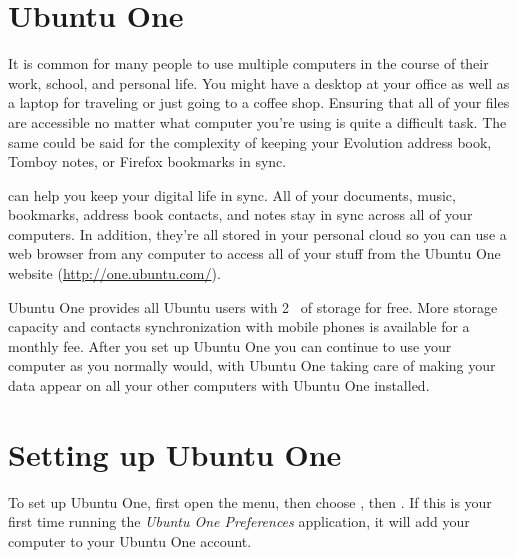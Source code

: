 
\begin{comment}

OUTLINE

[DONE] - Intro - What does Ubuntu One do
[DONE] - What are the Ubuntu 10.04 LTS features (files, notes, contacts, bookmarks, music sync)
[DONE] - How to setup? Launch the Preferences application for new and existing users, create an Ubuntu SSO account and subscribe to a plan. Add computer - add screenshot of Ubuntu One launcher under System > Preferences
[DONE] - Tour of Preferences application
[DONE] - Website features - http://one.ubuntu.com/
[DONE] - Where to get support - /support/, check blog, and read twitter/identi.ca

\end{comment}

\section{Ubuntu One}

It is common for many people to use multiple computers in the course of their work, school, and personal life. You might have a desktop at your office as well as a laptop for traveling or just going to a coffee shop. Ensuring that all of your files are accessible no matter what computer you're using is quite a difficult task. The same could be said for the complexity of keeping your Evolution address book, Tomboy notes, or Firefox bookmarks in sync.

 can help you keep your digital life in sync. All of your documents, music, bookmarks, address book contacts, and notes stay in sync across all of your computers. In addition, they're all stored in your personal cloud so you can use a web browser from any computer to access all of your stuff from the Ubuntu One website (\url{http://one.ubuntu.com/}).

Ubuntu One provides all Ubuntu users with 2~ of storage for free. More storage capacity and contacts synchronization with mobile phones is available for a monthly fee. After you set up Ubuntu One you can continue to use your computer as you normally would, with Ubuntu One taking care of making your data appear on all your other computers with Ubuntu One installed.

\section{Setting up Ubuntu One}
To set up Ubuntu One, first open the  menu, then choose , then . If this is your first time running the \emph{Ubuntu One Preferences} application, it will add your computer to your Ubuntu One account.

